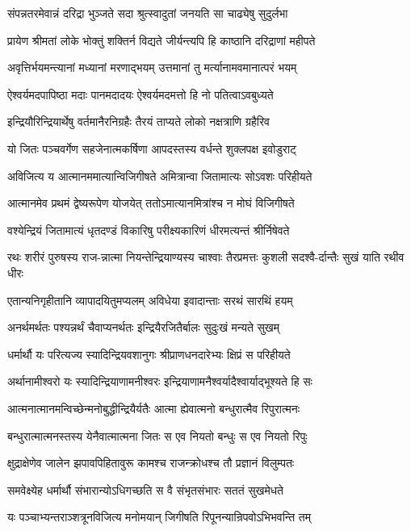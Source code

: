 \twolineshloka
{संपन्नतरमेवान्नं दरिद्रा भुञ्जते सदा}
{श्रुत्स्वादुतां जनयति सा चाढ्येषु सुदुर्लभा}


\twolineshloka
{प्रायेण श्रीमतां लोके भोक्तुं शक्तिर्न विद्यते}
{जीर्यन्त्यपि हि काष्ठानि दरिद्राणां महीपते}


\twolineshloka
{अवृत्तिर्भयमन्त्यानां मध्यानां मरणाद्भयम्}
{उत्तमानां तु मर्त्यानामवमानात्परं भयम्}


\twolineshloka
{ऐश्वर्यमदपापिष्ठा मदाः पानमदादयः}
{ऐश्वर्यमदमत्तो हि नो पतित्वाऽवबुध्यते}


\twolineshloka
{इन्द्रियौरिन्द्रियार्थेषु वर्तमानैरनिग्रहैः}
{तैरयं ताप्यते लोको नक्षत्राणि ग्रहैरिव}


\twolineshloka
{यो जितः पञ्चवर्गेण सहजेनात्मकर्षिणा}
{आपदस्तस्य वर्धन्ते शुक्लपक्ष इवोडुराट्}


\twolineshloka
{अविजित्य य आत्मानममात्यान्विजिगीषते}
{अमित्रान्वा जितामात्यः सोऽवशः परिहीयते}


\twolineshloka
{आत्मानमेव प्रथमं द्वेष्यरूपेण योजयेत्}
{ततोऽमात्यानमित्रांश्च न मोघं विजिगीषते}


\twolineshloka
{वश्येन्द्रियं जितामात्यं धृतदण्डं विकारिषु}
{परीक्ष्यकारिणं धीरमत्यन्तं श्रीर्निषेवते}


\twolineshloka
{रथः शरीरं पुरुषस्य राज-न्नात्मा नियन्तेन्द्रियाण्यस्य चाश्वाः}
{तैरप्रमत्तः कुशली सदश्वै-र्दान्तैः सुखं याति रथीव धीरः}


\twolineshloka
{एतान्यनिगृहीतानि व्यापादयितुमप्यलम्}
{अविधेया इवादान्ताः सरथं सारथिं हयम्}


\twolineshloka
{अनर्थमर्थतः पश्यन्नर्थं चैवाप्यनर्थतः}
{इन्द्रियैरजितैर्बालः सुदुःखं मन्यते सुखम्}


\twolineshloka
{धर्मार्थौ यः परित्यज्य स्यादिन्द्रियवशानुगः}
{श्रीप्राणधनदारेभ्यः क्षिप्रं स परिहीयते}


\twolineshloka
{अर्थानामीश्वरो यः स्यादिन्द्रियाणामनीश्वरः}
{इन्द्रियाणामनैश्वर्यादैश्वार्याद्भूश्यते हि सः}


\twolineshloka
{आत्मनात्मानमन्विच्छेन्मनोबुद्धीन्द्रियैर्यतैः}
{आत्मा ह्येवात्मनो बन्धुरात्मैव रिपुरात्मनः}


\twolineshloka
{बन्धुरात्मात्मनस्तस्य येनैवात्मात्मना जितः}
{स एव नियतो बन्धुः स एव नियतो रिपुः}


\twolineshloka
{क्षुद्राक्षेणेव जालेन झपावपिहितावुरू}
{कामश्च राजन्क्रोधश्च तौ प्रज्ञानं विलुम्पतः}


\twolineshloka
{समवेक्ष्येह धर्मार्थौ संभारान्योऽधिगच्छति}
{स वै संभृतसंभारः सततं सुखमेधते}


\twolineshloka
{यः पञ्चाभ्यन्तराञ्शत्रूनविजित्य मनोमयान्}
{जिगीषति रिपूनन्यान्रिपवोऽभिभवन्ति तम्}


